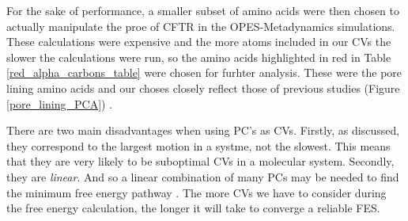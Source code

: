 For the sake of performance, a smaller subset of amino acids were then chosen to actually manipulate the proe of CFTR in the OPES-Metadynamics simulations. These calculations were expensive and the more atoms included in our CVs the slower the calculations were run, so the amino acids highlighted in red in Table \ref{red_alpha_carbons_table} were chosen for furhter analysis. These were the pore lining amino acids and our choses closely reflect those of previous studies (Figure \ref{pore_lining_PCA}) \cite{hoffman2018}. 

There are two main disadvantages when using PC's as CVs. Firstly, as discussed, they correspond to the largest motion in a systme, not the slowest. This means that they are very likely to be suboptimal CVs in a molecular system. Secondly, they are \textit{linear}. And so a linear combination of many PCs  may be needed to find the minimum free energy pathway \cite{}. The more CVs we have to consider during the free energy calculation, the longer it will take to converge a reliable FES.

